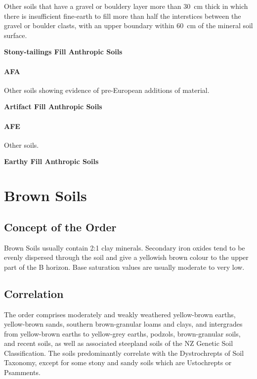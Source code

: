 \documentclass[
  letterpaper,
  DIV=11,
  numbers=noendperiod]{scrreprt}
\begin{document}
Other soils that have a gravel or bouldery layer more than 30~cm thick
in which there is insufficient fine-earth to fill more than half the
interstices between the gravel or boulder clasts, with an upper boundary
within 60~cm of the mineral soil surface.

\textbf{Stony-tailings Fill Anthropic Soils}

\hypertarget{sec-key-AFA}{%
\subsubsection{\texorpdfstring{\textbf{AFA}}{AFA}}\label{sec-key-AFA}}

Other soils showing evidence of pre-European additions of material.

\textbf{Artifact Fill Anthropic Soils}

\hypertarget{sec-key-AFE}{%
\subsubsection{\texorpdfstring{\textbf{AFE}}{AFE}}\label{sec-key-AFE}}

Other soils.

\textbf{Earthy Fill Anthropic Soils}


\hypertarget{sec-ord-B}{%
\chapter{Brown Soils}\label{sec-ord-B}}

\hypertarget{sec-con-B}{%
\section{Concept of the Order}\label{sec-con-B}}

Brown Soils usually contain 2:1 clay minerals. Secondary iron oxides
tend to be evenly dispersed through the soil and give a yellowish brown
colour to the upper part of the B horizon. Base saturation values are
usually moderate to very low.

\hypertarget{sec-cor-B}{%
\section{Correlation}\label{sec-cor-B}}

The order comprises moderately and weakly weathered yellow-brown earths,
yellow-brown sands, southern brown-granular loams and clays, and
intergrades from yellow-brown earths to yellow-grey earths, podzols,
brown-granular soils, and recent soils, as well as associated steepland
soils of the NZ Genetic Soil Classification. The soils predominantly
correlate with the Dystrochrepts of Soil Taxonomy, except for some stony
and sandy soils which are Ustochrepts or Psamments.
\end{document}
